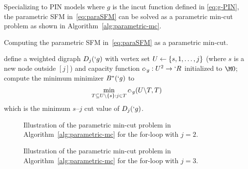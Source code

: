 \documentclass[conference,letterpaper]{IEEEtran}
\begin{document}
Specializing to PIN models where $g$ is the incut function defined in \eqref{eq:g-PIN}, the parametric SFM in~\eqref{eq:paraSFM} can be solved as a parametric min-cut problem as shown in Algorithm~\ref{alg:parametric-mc}.

\begin{algorithm}[h!]
	\caption{Computing the parametric SFM in~\eqref{eq:paraSFM} as a parametric min-cut.}
	\label{alg:parametric-mc}
	\DontPrintSemicolon
	\SetAlgoLined
	define a weighted digraph $D_j(`g)$ with vertex set $U\leftarrow \{s,1,\dots,j\}$ (where $s$ is a new node outside $[j]$) and capacity function $c_{`g}:U^2\to `R$ initialized to $\M0$;\;
	compute the minimum minimizer $B^*(`g)$ to
	\begin{align}
		\min_{T\subseteq U\backslash\{s\}: j\in T} c_{`g}(U\backslash T,T)
		\label{eq:paraMC}
	\end{align}
	which is the minimum $s$--$j$ cut value of $D_j(`g)$.
\end{algorithm}

\begin{figure*}
	\begin{center}
		\hfill
		\hfill
	\end{center}
	\caption{Illustration of the parametric min-cut problem in Algorithm~\ref{alg:parametric-mc} for
the for-loop  with $j=2$.}
	\label{fig:eg:D2}
\end{figure*}

\begin{figure*}
	\begin{center}
		\hfill
		\hfill
	\end{center}
	\caption{Illustration of the parametric min-cut problem in Algorithm~\ref{alg:parametric-mc} for
the for-loop with $j=3$.}
	\label{fig:eg:D3}
\end{figure*}
\end{document}
